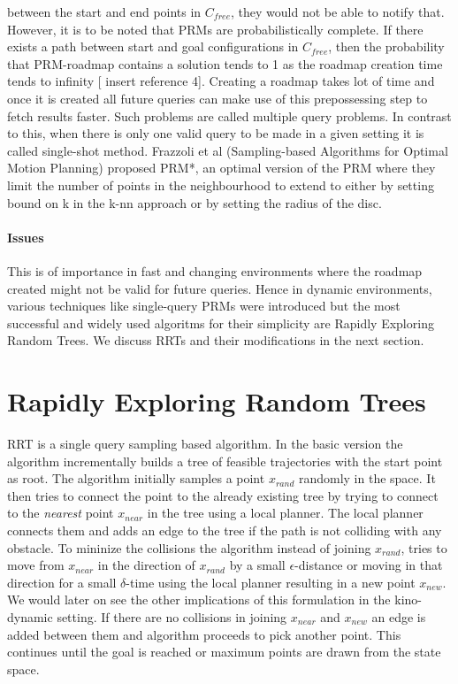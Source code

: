 \documentclass[MTech]{iitmdiss}
\begin{document}
between the start and end points in $C_{free}$, they would not be able to notify that. However, it is to be noted that PRMs are probabilistically complete. If there exists a path between start and goal configurations in $C_{free}$, then the probability that PRM-roadmap contains a solution tends to 1 as the roadmap creation time tends to infinity [ insert reference 4]. Creating a roadmap takes lot of time and once it is created all future queries can make use of this prepossessing step to fetch results faster. Such problems are called multiple query problems. In contrast to this, when there is only one valid query to be made in a given setting it is called single-shot method. Frazzoli et al (Sampling-based Algorithms for Optimal Motion Planning) proposed PRM*, an optimal version of the PRM where they limit the number of points in the neighbourhood to extend to either by setting bound on k in the k-nn approach or by setting the radius of the disc. 
\subsubsection*{Issues}
 This is of importance in fast and changing environments where the roadmap created might not be valid for future queries. Hence in dynamic environments, various techniques like single-query PRMs were introduced but the most successful and widely used algoritms for their simplicity are Rapidly Exploring Random Trees. We discuss RRTs and their modifications in the next section.  

\chapter{Rapidly Exploring Random Trees}

RRT is a single query sampling based algorithm. In the basic version the algorithm incrementally builds a tree of feasible trajectories with the start point as root. The algorithm initially samples a point $x_{rand}$ randomly in the space. It then tries to connect the point to the already existing tree by trying to connect to the \emph{nearest} point $x_{near}$ in the tree using a local planner. The local planner connects them and adds an edge to the tree if the path is not colliding with any obstacle. To mininize the collisions the algorithm instead of joining $x_{rand}$, tries to move from $x_{near}$ in the direction of $x_{rand}$ by a small $\epsilon$-distance or moving in that direction for a small $\delta$-time using the local planner resulting in a new point $x_{new}$. We would later on see the other implications of this formulation in the kino-dynamic setting. If there are no collisions in joining $x_{near}$ and $x_{new}$ an edge is added between them and algorithm proceeds to pick another point. This continues until the goal is reached or maximum points are drawn from the state space. 
\end{document}
